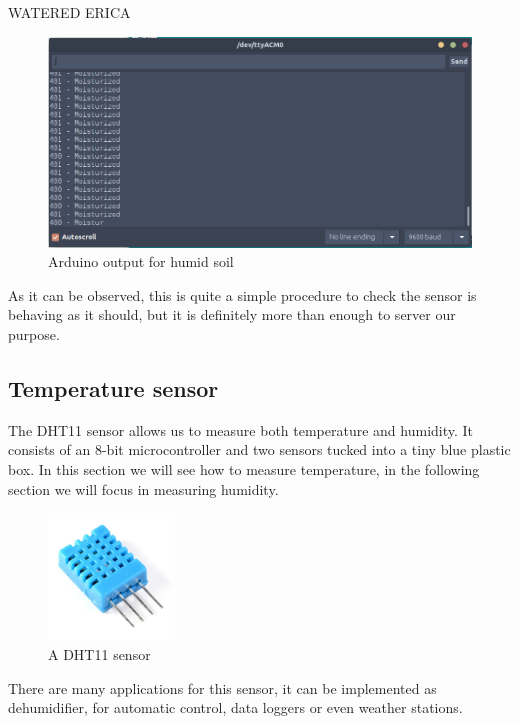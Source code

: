 WATERED ERICA

\begin{figure}[H]
    \centering
    \includegraphics[width=1\textwidth]{fig/humedo.png}
    \caption{Arduino output for humid soil}
    \label{fig:humid-soil}
\end{figure}


As it can be observed, this is quite a simple procedure to check the sensor is behaving as it should, but it is definitely more than enough to server our purpose.

\subsection{Temperature sensor}
The DHT11 sensor\cite{dht11-manual} allows us to measure both temperature and humidity. It consists of an 8-bit microcontroller and two sensors tucked into a tiny blue plastic box. In this section we will see how to measure temperature, in the following section we will focus in measuring humidity.

\begin{figure}[H]
    \centering
    \includegraphics[width=0.3\textwidth]{fig/dht11.jpg}
    \caption{A DHT11 sensor}
    \label{fig:dht11}
\end{figure}

There are many applications for this sensor, it can be implemented as dehumidifier, for automatic control, data loggers or even weather stations. 


